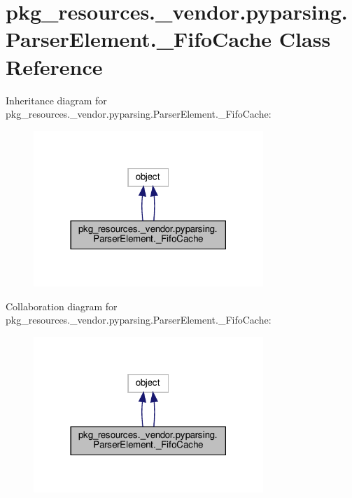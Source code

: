 \hypertarget{classpkg__resources_1_1__vendor_1_1pyparsing_1_1ParserElement_1_1__FifoCache}{}\section{pkg\+\_\+resources.\+\_\+vendor.\+pyparsing.\+Parser\+Element.\+\_\+\+Fifo\+Cache Class Reference}
\label{classpkg__resources_1_1__vendor_1_1pyparsing_1_1ParserElement_1_1__FifoCache}


Inheritance diagram for pkg\+\_\+resources.\+\_\+vendor.\+pyparsing.\+Parser\+Element.\+\_\+\+Fifo\+Cache\+:
\nopagebreak
\begin{figure}[H]
\begin{center}
\leavevmode
\includegraphics[width=246pt]{classpkg__resources_1_1__vendor_1_1pyparsing_1_1ParserElement_1_1__FifoCache__inherit__graph}
\end{center}
\end{figure}


Collaboration diagram for pkg\+\_\+resources.\+\_\+vendor.\+pyparsing.\+Parser\+Element.\+\_\+\+Fifo\+Cache\+:
\nopagebreak
\begin{figure}[H]
\begin{center}
\leavevmode
\includegraphics[width=246pt]{classpkg__resources_1_1__vendor_1_1pyparsing_1_1ParserElement_1_1__FifoCache__coll__graph}
\end{center}
\end{figure}
